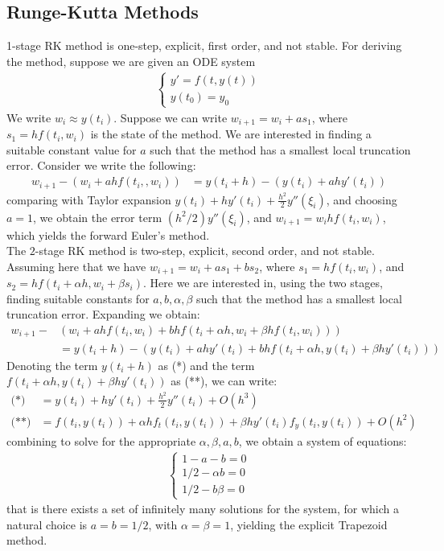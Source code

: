 \documentclass[11pt,oneside]{book}
\theoremstyle{break}
\theoremstyle{break}
\begin{document}
\subsection*{Runge-Kutta Methods}
1-stage RK method is one-step, explicit, first order, and not stable. For deriving the method, suppose we are given an ODE system
\begin{align*}
\begin{cases}
y' = f(t,y(t)) \\
y(t_0) = y_0
\end{cases}
\end{align*}
We write $w_i \approx y(t_i)$. Suppose we can write $w_{i+1} = w_i + as_1$, where $s_1 = hf(t_i, w_i)$ is the state of the method. We are interested in finding a suitable constant value for $a$ such that the method has a smallest local truncation error. Consider we write the following:
\begin{align*}
w_{i+1} - \left( w_i + ah f(t_i,, w_i)\right) &= y(t_i + h) - \left( y(t_i) + ah y'(t_i)\right)
\end{align*}
comparing with Taylor expansion $y(t_i) + hy'(t_i) + \frac{h^2}{2}y''(\xi_i)$, and choosing $a=1$, we obtain the error term $(h^2/2)y''(\xi_i)$, and $w_{i+1} = w_i hf(t_i, w_i)$, which yields the forward Euler's method. \\

The $2$-stage RK method is two-step, explicit, second order, and not stable. Assuming here that we have $w_{i+1} = w_i + as_1 + bs_2$, where $s_1 = hf(t_i, w_i)$, and $s_2 = hf(t_i + \alpha h, w_i + \beta s_i)$. Here we are interested in, using the two stages, finding suitable constants for $a,b, \alpha, \beta$ such that the method has a smallest local truncation error. Expanding we obtain:
\begin{align*}
w_{i+1} - &\left( w_i + ahf(t_i, w_i) + bhf(t_i+\alpha h , w_i + \beta hf (t_i, w_i))\right) \\
&= y(t_i + h) - \left( y(t_i) + ahy'(t_i) + bhf(t_i+\alpha h, y(t_i) + \beta h y'(t_i))\right)
\end{align*}
Denoting the term $y(t_i + h) $ as (*) and the term $f(t_i+\alpha h, y(t_i) + \beta h y'(t_i))$ as (**), we can write:
\begin{align*}
\text{(*)} &= y(t_i) + hy'(t_i) + \frac{h^2}{2}y''(t_i) + O(h^3)\\
\text{(**)}&= f(t_i,y(t_i)) + \alpha h f_t(t_i, y(t_i)) + \beta hy'(t_i) f_y(t_i, y(t_i)) + O(h^2)
\end{align*}
combining to solve for the appropriate $\alpha, \beta, a, b$, we obtain a system of equations:
\begin{align*}
\begin{cases}
1-a-b = 0 \\
1/2 - \alpha b = 0 \\
1/2 - b\beta = 0
\end{cases}
\end{align*}
that is there exists a set of infinitely many solutions for the system, for which a natural choice is $a = b= 1/2$, with $\alpha = \beta = 1$, yielding the explicit Trapezoid method. 
\end{document}
